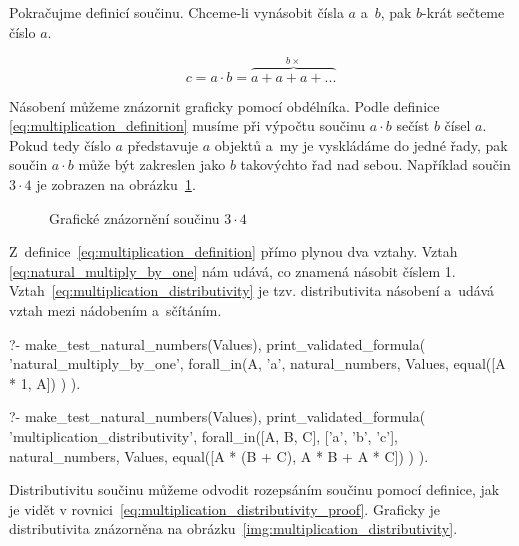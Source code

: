 Pokračujme definicí součinu. Chceme-li vynásobit čísla \(a\) a~\(b\), pak \(b\)-krát sečteme číslo \(a\).

\begin{equation}
\label{eq:multiplication_definition}
c = a \cdot b = \overbrace{a + a + a + ...}^{b \times}
\end{equation}

Násobení můžeme znázornit graficky pomocí obdélníka. Podle definice \eqref{eq:multiplication_definition} musíme při výpočtu součinu \(a \cdot b\) sečíst \(b\) čísel \(a\). Pokud tedy číslo \(a\) představuje \(a\) objektů a~my je vyskládáme do jedné řady, pak součin \(a \cdot b\) může být zakreslen jako \(b\) takovýchto řad nad sebou. Například součin \(3 \cdot 4\) je zobrazen na obrázku~\ref{img:multiplication_definition}. 

\begin{figure}[!h]
\centering
{}
\caption{Grafické znázornění součinu \(3 \cdot 4\)}
\label{img:multiplication_definition}
\end{figure}

Z~definice~\eqref{eq:multiplication_definition} přímo plynou dva vztahy. Vztah \eqref{eq:natural_multiply_by_one} nám udává, co znamená násobit číslem 1. Vztah~\eqref{eq:multiplication_distributivity} je tzv. distributivita násobení a~udává vztah mezi nádobením a~sčítáním.

\begin{fact}
\begin{prolog}
?-	make_test_natural_numbers(Values),
	print_validated_formula(
		'natural_multiply_by_one',
		forall_in(A, 'a', natural_numbers, Values,
			equal([A * 1, A])
		)
	).				
\end{prolog}
\begin{prolog}
?-	make_test_natural_numbers(Values),
	print_validated_formula(
		'multiplication_distributivity',
		forall_in([A, B, C], ['a', 'b', 'c'], natural_numbers, Values,
			equal([A * (B + C), A * B + A * C])
		)
	).				
\end{prolog}
\end{fact}

Distributivitu součinu můžeme odvodit rozepsáním součinu pomocí definice, jak je vidět v rovnici~\eqref{eq:multiplication_distributivity_proof}. Graficky je distributivita znázorněna na obrázku~\ref{img:multiplication_distributivity}.

